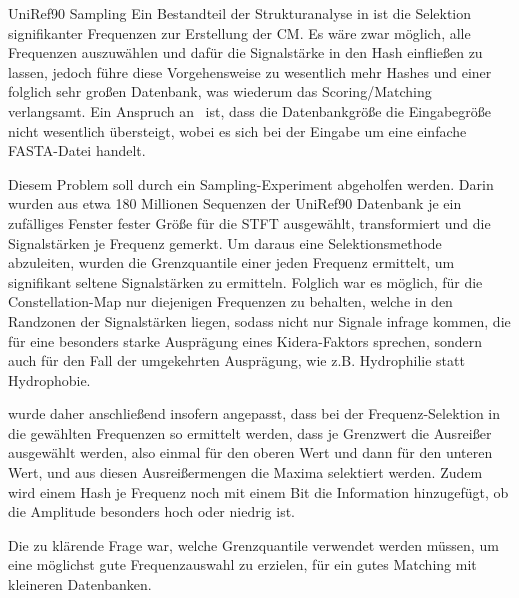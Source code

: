     \begin{experiment}{UniRef90 Sampling} %
        \label{exp:uniref90}
        Ein Bestandteil der Strukturanalyse in  ist die Selektion signifikanter Frequenzen zur Erstellung der \ac{CM}. Es wäre zwar möglich, alle Frequenzen auszuwählen und dafür die Signalstärke in den Hash einfließen zu lassen, jedoch führe diese Vorgehensweise zu wesentlich mehr Hashes und einer folglich sehr großen Datenbank, was wiederum das Scoring/Matching verlangsamt. Ein Anspruch an \protfin\ ist, dass die Datenbankgröße die Eingabegröße nicht wesentlich übersteigt, wobei es sich bei der Eingabe um eine einfache FASTA-Datei handelt.

        Diesem Problem soll durch ein Sampling-Experiment abgeholfen werden. Darin wurden aus etwa 180 Millionen Sequenzen der UniRef90 Datenbank je ein zufälliges Fenster fester Größe für die \ac{STFT} ausgewählt, transformiert und die Signalstärken je Frequenz gemerkt. Um daraus eine Selektionsmethode abzuleiten, wurden die Grenzquantile einer jeden Frequenz ermittelt, um signifikant seltene Signalstärken zu ermitteln. Folglich war es möglich, für die Constellation-Map nur diejenigen Frequenzen zu behalten, welche in den Randzonen der Signalstärken liegen, sodass nicht nur Signale infrage kommen, die für eine besonders starke Ausprägung eines Kidera-Faktors sprechen, sondern auch für den Fall der umgekehrten Ausprägung, wie z.B. Hydrophilie statt Hydrophobie.

         wurde daher anschließend insofern angepasst, dass bei der Frequenz-Selektion in  die gewählten Frequenzen so ermittelt werden, dass je Grenzwert die Ausreißer ausgewählt werden, also einmal für den oberen Wert und dann für den unteren Wert, und aus diesen Ausreißermengen die Maxima selektiert werden. Zudem wird einem Hash je Frequenz noch mit einem Bit die Information hinzugefügt, ob die Amplitude besonders hoch oder niedrig ist.

        Die zu klärende Frage war, welche Grenzquantile verwendet werden müssen, um eine möglichst gute Frequenzauswahl zu erzielen, für ein gutes Matching mit kleineren Datenbanken.
    \end{experiment}
